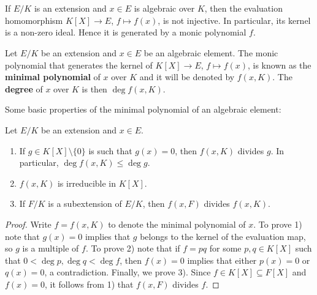 \chapter{}


If $E/K$ is an extension and $x\in E$ is algebraic
over $K$, then the evaluation homomorphism 
$K[X]\to E$, $f\mapsto f(x)$, is not injective. In particular,
its kernel is a non-zero ideal. Hence 
it is generated by a monic polynomial $f$. 

\begin{definition}
	Let $E/K$ be an extension and $x\in E$ be an algebraic element.  The monic
	polynomial that generates the kernel of $K[X]\to E$, $f\mapsto f(x)$, is
	known as the \textbf{minimal polynomial} of $x$ over $K$ and it will be
	denoted by $f(x,K)$. The \textbf{degree} of $x$ over $K$ is then $\deg
	f(x,K)$. 
\end{definition}

Some basic properties of the minimal polynomial of an algebraic element:

\begin{proposition}
	Let $E/K$ be an extension and $x\in E$. 
	\begin{enumerate}
		\item If $g\in K[X]\setminus\{0\}$ is such that $g(x)=0$, then $f(x,K)$ divides $g$. In particular, 
		$\deg f(x,K)\leq\deg g$. 
		\item $f(x,K)$ is irreducible in $K[X]$.
		\item If $F/K$ is a subextension of $E/K$, then $f(x,F)$ divides
			$f(x,K)$. 
	\end{enumerate}
\end{proposition}

\begin{proof}
	Write $f=f(x,K)$ to denote the minimal polynomial of $x$. 
	To prove 1) note that $g(x)=0$ implies that	$g$ belongs to the kernel of
	the evaluation map, so $g$ is a multiple of $f$. To prove 2) 
	note that if $f=pq$ for some $p,q\in K[X]$ such that
	$0<\deg p,\deg q<\deg f$, then $f(x)=0$ implies that 
	either $p(x)=0$ or $q(x)=0$, a
	contradiction. Finally, we prove 3). Since $f\in K[X]\subseteq F[X]$ 
	and $f(x)=0$, it follows from 1) that $f(x,F)$ divides $f$. 
\end{proof}

